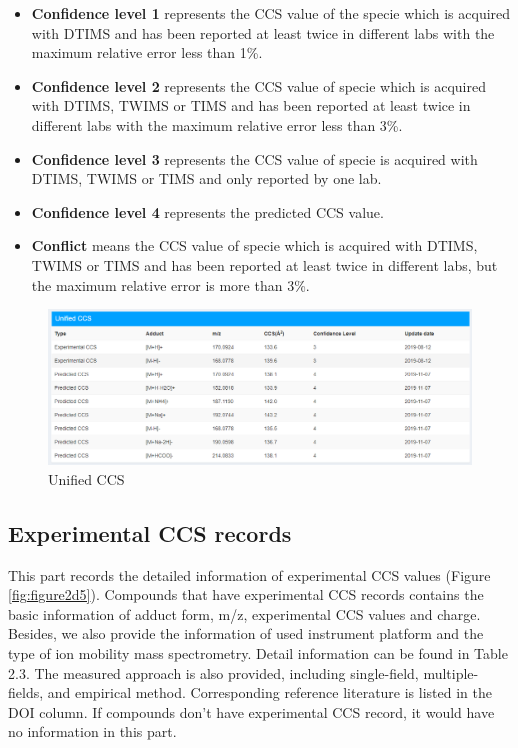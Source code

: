 \documentclass[12pt,]{book}
\providecommand{\tightlist}{%
  \setlength{\itemsep}{0pt}\setlength{\parskip}{0pt}}
\begin{document}
\begin{itemize}
\tightlist
\item
  \textbf{Confidence level 1} represents the CCS value of the specie
  which is acquired with DTIMS and has been reported at least twice in
  different labs with the maximum relative error less than 1\%.
\item
  \textbf{Confidence level 2} represents the CCS value of specie which
  is acquired with DTIMS, TWIMS or TIMS and has been reported at least
  twice in different labs with the maximum relative error less than 3\%.
\item
  \textbf{Confidence level 3} represents the CCS value of specie is
  acquired with DTIMS, TWIMS or TIMS and only reported by one lab.
\item
  \textbf{Confidence level 4} represents the predicted CCS value.
\item
  \textbf{Conflict} means the CCS value of specie which is acquired with
  DTIMS, TWIMS or TIMS and has been reported at least twice in different
  labs, but the maximum relative error is more than 3\%.
\end{itemize}

\begin{figure}

{\centering \includegraphics{images/chapter2/figure2.4unified_ccs} 

}

\caption{Unified CCS}\label{fig:figure2d4}
\end{figure}

\subsection{Experimental CCS records}\label{chapter2d2d3}

This part records the detailed information of experimental CCS values
(Figure \ref{fig:figure2d5}). Compounds that have experimental CCS
records contains the basic information of adduct form, m/z, experimental
CCS values and charge. Besides, we also provide the information of used
instrument platform and the type of ion mobility mass spectrometry.
Detail information can be found in Table 2.3. The measured approach is
also provided, including single-field, multiple-fields, and empirical
method. Corresponding reference literature is listed in the DOI column.
If compounds don't have experimental CCS record, it would have no
information in this part.
\end{document}
